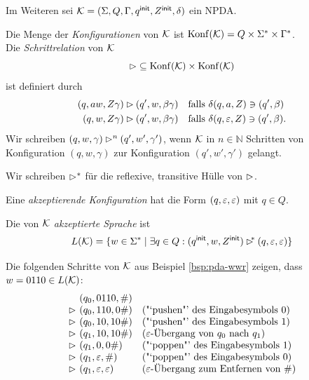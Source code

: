 Im Weiteren sei $\mathcal{K}=(\Sigma,Q,\Gamma,q^\mathsf{init},Z^\mathsf{init},\delta)$ ein \ac{NPDA}.
\begin{Def}[name={[Menge der Konfigurationen eines \acs*{NPDA}]}]
        Die Menge der \emph{Konfigurationen} von $\mathcal{K}$ ist $\operatorname{Konf}(\mathcal{K}) = Q\times\Sigma^*\times\Gamma^*$.\\
        Die \emph{Schrittrelation} von $\mathcal{K}$
  \begin{displaymath}
    \mathop{\rhd} \subseteq \operatorname{Konf}(\mathcal{K}) \times \operatorname{Konf}(\mathcal{K}) 
  \end{displaymath}
  ist definiert durch
  \begin{align*}
    (q,aw,Z\gamma) &\rhd (q',w,\beta\gamma) &&\text{falls }\delta(q,a,Z)\ni(q',\beta)\\
    (q,w,Z\gamma) &\rhd (q',w,\beta\gamma) &&\text{falls }\delta(q,\varepsilon,Z)\ni(q',\beta).
  \end{align*}
  Wir schreiben $(q,w,\gamma) \rhd^n (q',w',\gamma')$, wenn $\mathcal{K}$
  in $n \in \mathbb{N}$ Schritten von Konfiguration $(q,w,\gamma)$ zur
  Konfiguration $(q',w',\gamma')$ gelangt. 

  Wir schreiben ${\rhd^*}$ für die reflexive, transitive Hülle
  von ${\rhd}$.

  Eine  \emph{akzeptierende Konfiguration} hat die Form $(q,\varepsilon,\varepsilon)$ mit $q\in Q$.
  
  Die von $\mathcal{K}$ \emph{akzeptierte Sprache} ist
  \begin{displaymath}
                L(\mathcal{K}) = \{ w\in\Sigma^* \mid \exists q\in Q: (q^\mathsf{init},w,Z^\mathsf{init}) \rhd^{\!\!*} (q,\varepsilon,\varepsilon) \}
  \end{displaymath}
\end{Def}

\begin{Bsp*}
  Die folgenden Schritte von $\mathcal{K}$ aus Beispiel \ref{bsp:pda-wwr} zeigen, dass $w = 0110 \in L(\mathcal{K})$:
  \begin{displaymath}
  \begin{array}{r@{\ }ll}
    & (q_0, 0110, \#) \\
    \ConfRel & (q_0, 110, 0\#)  &\text{("`pushen"' des Eingabesymbols $0$)}\\
    \ConfRel & (q_0, 10, 10\#)  &\text{("`pushen"' des Eingabesymbols $1$)}\\
    \ConfRel & (q_1, 10, 10\#)  &\text{($\Eps$-Übergang von $q_0$ nach $q_1$)} \\
    \ConfRel & (q_1, 0, 0\#)  &\text{("`poppen"' des Eingabesymbols $1$)}\\
    \ConfRel & (q_1,\Eps, \#) &\text{("`poppen"' des Eingabesymbols $0$)}\\
    \ConfRel & (q_1, \Eps, \Eps) &\text{($\Eps$-Übergang zum Entfernen von $\#$)}
  \end{array}
\end{displaymath}
\end{Bsp*}

